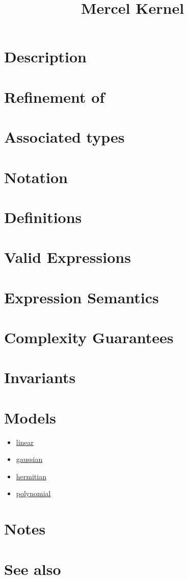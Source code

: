 \documentclass{article}
\begin{document}
\title{Mercel Kernel}
\maketitle


\section*{Description}
\section*{Refinement of}
\section*{Associated types}
\section*{Notation}
\section*{Definitions}
\section*{Valid Expressions}
\section*{Expression Semantics}

\section*{Complexity Guarantees}

\section*{Invariants}

\section*{Models}

\begin{itemize}
\item \href{research/kml/documentation/linear.html}{linear}
\item \href{research/kml/documentation/gaussian.html}{gaussian}
\item \href{research/kml/documentation/hermitian.html}{hermitian}
\item \href{research/kml/documentation/polynomial.html}{polynomial}
\end{itemize}

\section*{Notes}


\section*{See also}




\end{document}
